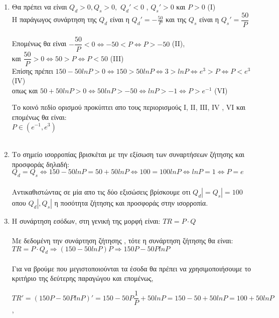 \documentclass[12pt,a4paper]{article}
\begin{document}
\begin{enumerate}
\item Θα πρέπει να είναι $Q_d> 0, Q_s>0 ,$ $Q_d' <0 $ , $Q_s'>0$ και $P>0$ (I) \\
Η παράγωγος συνάρτηση της $Q_d$ είναι η $Q_d'=-\frac{50}{P} $ και της $Q_s$ είναι η $Q_s'=\dfrac{50}{P}$ \\\\
Επομένως θα είναι $-\dfrac{50}{P}<0 \Leftrightarrow -50<P \Leftrightarrow P>-50$ (II),\\ και $ \dfrac{50}{Ρ}>0\Leftrightarrow 50>P \Leftrightarrow P<50 $ (III) \\

Επίσης πρέπει $150-50lnP > 0 \Leftrightarrow 150 > 50 lnP \Leftrightarrow 3 >lnP \Leftrightarrow e^3 > P \Leftrightarrow P< e^3$ \textlatin{(IV)} \\ οπως και $ 50+50lnP >0 \Leftrightarrow 50lnP > -50 \Leftrightarrow lnP > -1 \Leftrightarrow P > e^{-1} $ \textlatin{(VI)} 

Το κοινό πεδίο ορισμού προκύπτει απο τους περιορισμούς Ι, ΙΙ, ΙΙΙ, \textlatin{IV} , \textlatin{VI} 
και επομένως θα είναι: \\ $ P \in  (e^{-1}, e^3) $\\\\
\item Το σημείο ισορροπίας βρισκέται με την εξίσωση των συναρτήσεων ζήτησης και προσφοράς δηλαδή: $Q_d=Q_s \Leftrightarrow 150-50lnP = 50+ 50lnP \Leftrightarrow 100 = 100lnP \Leftrightarrow lnP = 1 \Leftrightarrow P=e $\\\\
Αντικαθιστώντας σε μία απο τις δύο εξισώσεις βρίσκουμε οτι $Q_d|  = Q_s|  = 100$ οπου $Q_d|  , Q_s| $ η ποσότητα ζήτησης και προσφοράς στην ισορροπία.\\

\item Η συνάρτηση εσόδων, στη γενική της μορφή είναι: $TR = P \cdot Q $\\\\
Με δεδομένη την συνάρτηση  ζήτησης , τότε η συνάρτηση ζήτησης θα είναι: $TR = P \cdot Q_d \Rightarrow (150-50lnP)P \Rightarrow 150P - 50PlnP $\\\\
Για να βρούμε που μεγιστοποιούνται τα έσοδα θα πρέπει να χρησιμοποιήσουμε το κριτήριο της δεύτερης παραγώγου και επομένως,

$TR' = (150P - 50PlnP)' = 150 - 50P \dfrac{1}{P} + 50lnP = 150 - 50 + 50lnP = 100 + 50lnP  $ , \\


\end{enumerate}
\end{document}
